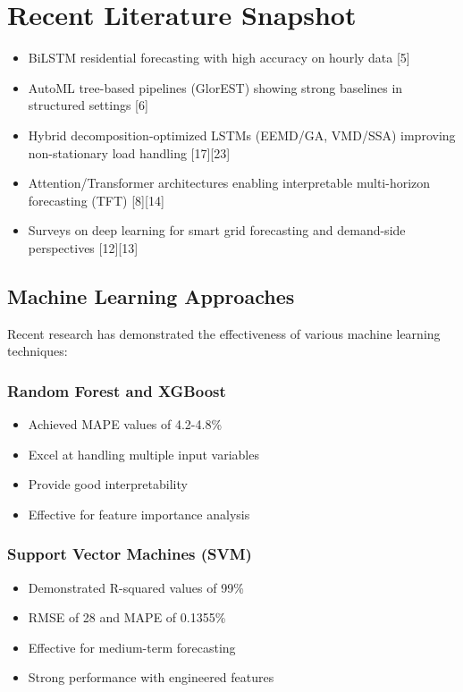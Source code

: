 \documentclass[12pt,a4paper]{report}
\begin{document}
\section{Recent Literature Snapshot}
\begin{itemize}
\item BiLSTM residential forecasting with high accuracy on hourly data [5]
\item AutoML tree-based pipelines (GlorEST) showing strong baselines in structured settings [6]
\item Hybrid decomposition-optimized LSTMs (EEMD/GA, VMD/SSA) improving non-stationary load handling [17][23]
\item Attention/Transformer architectures enabling interpretable multi-horizon forecasting (TFT) [8][14]
\item Surveys on deep learning for smart grid forecasting and demand-side perspectives [12][13]
\end{itemize}

\subsection{Machine Learning Approaches}
Recent research has demonstrated the effectiveness of various machine learning techniques:

\subsubsection{Random Forest and XGBoost}
\begin{itemize}
\item Achieved MAPE values of 4.2-4.8\%
\item Excel at handling multiple input variables
\item Provide good interpretability
\item Effective for feature importance analysis
\end{itemize}

\subsubsection{Support Vector Machines (SVM)}
\begin{itemize}
\item Demonstrated R-squared values of 99\%
\item RMSE of 28 and MAPE of 0.1355\%
\item Effective for medium-term forecasting
\item Strong performance with engineered features
\end{itemize}
\end{document}
